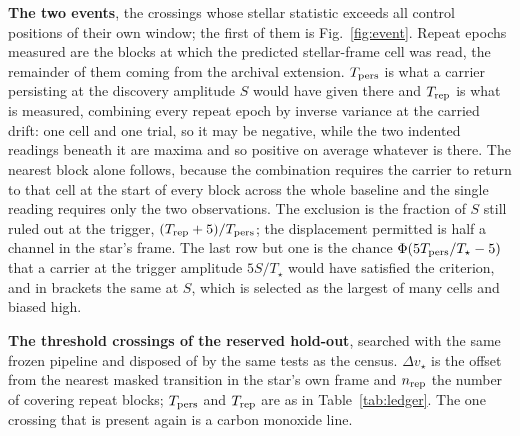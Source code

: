 \begin{table}
\centering
\caption{\textbf{The two events}, the crossings whose
stellar statistic exceeds all \NCtrl{} control positions of their own window;
the first of them is Fig.~\ref{fig:event}.
Repeat epochs measured are the blocks at which the predicted stellar-frame
cell was read, the remainder of them coming from the archival extension.
$T_{\rm pers}$ is what a carrier persisting at the discovery amplitude $S$
would have given there and $T_{\rm rep}$ is what is measured, combining every
repeat epoch by inverse variance at the carried drift: one cell and one
trial, so it may be negative, while the two indented readings beneath it are
maxima and so positive on average whatever is there. The nearest block alone
follows, because the combination requires the carrier to return to that cell
at the start of every block across the whole baseline and the single reading
requires only the two observations. The exclusion is the fraction of $S$ still
ruled out at the trigger, $(T_{\rm rep}+5)/T_{\rm pers}$; the displacement
permitted is half a channel in the star's frame. The last row but one is the
chance $\Phi(5T_{\rm pers}/T_\star-5)$ that a carrier at the trigger
amplitude $5S/T_\star$ would have satisfied the criterion, and in brackets the
same at $S$, which is selected as the largest of many cells and biased high.}
\label{tab:cand}
\footnotesize

\end{table}

\begin{table}
\centering
\caption{\textbf{The threshold crossings of the reserved hold-out}, searched
with the same frozen pipeline and disposed of by the same tests as the
census. $\Delta v_\star$ is the offset from the nearest masked transition in
the star's own frame and $n_{\rm rep}$ the number of covering repeat blocks;
$T_{\rm pers}$ and $T_{\rm rep}$ are as in Table~\ref{tab:ledger}. The one
crossing that is present again is a carbon monoxide line.}
\label{tab:holdout}
\scriptsize

\end{table}





